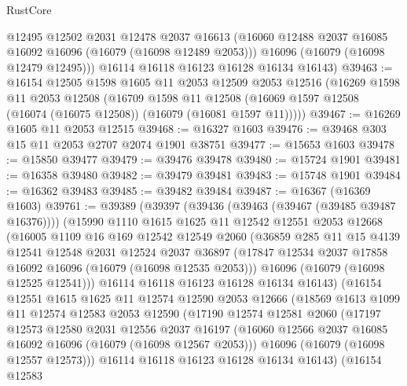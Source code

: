 \begin{lexlean}{RustCore}
\begin{coremodule}
        @12495
        @12502
        @2031
        @12478
        @2037
        @16613
        (@16060 @12488 @2037 @16085 @16092 @16096 (@16079 (@16098 @12489 @2053)))
        @16096
        (@16079 (@16098 @12479 @12495)))
      @16114
      @16118
      @16123
      @16128
      @16134
      @16143)
@39463 := @16154
    @12505
    @1598
    @1605
    @11
    @2053
    @12509
    @2053
    @12516
    (@16269
      @1598
      @11
      @2053
      @12508
      (@16709
        @1598
        @11
        @12508
        (@16069 @1597 @12508 (@16074 (@16075 @12508)) (@16079 (@16081 @1597 @11)))))
@39467 := @16269 @1605 @11 @2053 @12515
@39468 := @16327 @1603
@39476 := @39468 @303 @15 @11 @2053 @2707 @2074 @1901 @38751
@39477 := @15653 @1603
@39478 := @15850 @39477
@39479 := @39476 @39478
@39480 := @15724 @1901
@39481 := @16358 @39480
@39482 := @39479 @39481
@39483 := @15748 @1901
@39484 := @16362 @39483
@39485 := @39482 @39484
@39487 := @16367 (@16369 @1603)
@39761 := @39389
    (@39397
      (@39436 (@39463 (@39467 (@39485 @39487 @16376))))
      (@15990
        @1110
        @1615
        @1625
        @11
        @12542
        @12551
        @2053
        @12668
        (@16005
          @1109
          @16
          @169
          @12542
          @12549
          @2060
          (@36859
            @285
            @11
            @15
            @4139
            @12541
            @12548
            @2031
            @12524
            @2037
            @36897
            (@17847 @12534 @2037 @17858 @16092 @16096 (@16079 (@16098 @12535 @2053)))
            @16096
            (@16079 (@16098 @12525 @12541)))
          @16114
          @16118
          @16123
          @16128
          @16134
          @16143)
        (@16154
          @12551
          @1615
          @1625
          @11
          @12574
          @12590
          @2053
          @12666
          (@18569
            @1613
            @1099
            @11
            @12574
            @12583
            @2053
            @12590
            (@17190
              @12574
              @12581
              @2060
              (@17197
                @12573
                @12580
                @2031
                @12556
                @2037
                @16197
                (@16060 @12566 @2037 @16085 @16092 @16096 (@16079 (@16098 @12567 @2053)))
                @16096
                (@16079 (@16098 @12557 @12573)))
              @16114
              @16118
              @16123
              @16128
              @16134
              @16143)
            (@16154
              @12583

\end{coremodule}
\end{lexlean}
